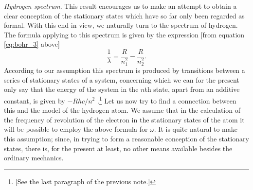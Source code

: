 \emph{Hydrogen spectrum}. This result encourages us to make an attempt
to obtain a clear conception of the stationary states which have so far
only been regarded as formal. With this end in view, we naturally turn
to the spectrum of hydrogen. The formula applying to this spectrum is
given by the expression {[}from equation \eqref{eq:bohr_3} above{]}
%
\begin{equation*}
\frac{1}{\lambda} = \frac{R}{n_1^2} - \frac{R}{n_2^2} .
\end{equation*}
%
According to our assumption this spectrum is produced by transitions
between a series of stationary states of a system, concerning which we
can for the present only say that the energy of the system in the
$n$th state, apart from an additive constant, is given by
$-Rhc/n^2$ .\footnote{{[}See the last paragraph of the previous
  note.{]}} Let us now try to find a connection between this and the
model of the hydrogen atom. We assume that in the calculation of the
frequency of revolution of the electron in the stationary states of the
atom it will be possible to employ the above formula for $\omega$. It is
quite natural to make this assumption; since, in trying to form a
reasonable conception of the stationary states, there is, for the
present at least, no other means available besides the ordinary
mechanics.

